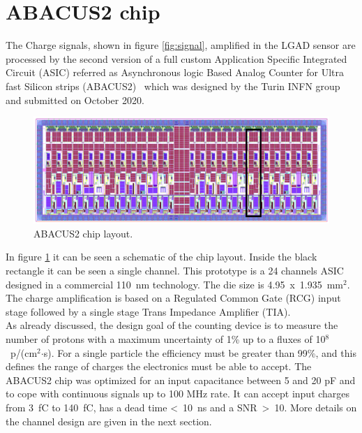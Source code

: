 \section{ABACUS2 chip}\label{chip}
\noindent The Charge signals, shown in figure \ref{fig:signal}, amplified in the LGAD sensor are processed by the second version of a full custom Application Specific Integrated Circuit (ASIC) referred as Asynchronous logic Based Analog Counter for Ultra fast Silicon strips (ABACUS2)~\cite{abacus,dac} which was designed by the Turin INFN group and submitted on October 2020.
\begin{figure}[H]
	\centering
	\includegraphics[width=0.9\linewidth]{IMG/ch2/ABACUS2.png}
	\caption{ABACUS2 chip layout.}
	\label{fig:abacus2}
\end{figure}
\noindent In figure \ref{fig:abacus2} it can be seen a schematic of the chip layout.
Inside the black rectangle it can be seen a single channel.
This prototype is a 24 channels ASIC designed in a commercial 110~nm technology.
The die size is 4.95~x~1.935~mm$^2$.
The charge amplification is based on a Regulated Common Gate (RCG) input stage followed by a single stage Trans Impedance Amplifier (TIA).\\
As already discussed, the design goal of the counting device is to measure the number of protons with a maximum uncertainty of 1\% up to a fluxes of 10$^8$~p/(cm$^2$$\cdot$s).
For a single particle the efficiency must be greater than 99\%, and this defines the range of charges the electronics must be able to accept.
The ABACUS2 chip was optimized for an input capacitance between 5 and 20 pF and to cope with continuous signals up to 100 MHz rate.
It can accept input charges from 3~fC to 140~fC, has a dead time <~10~ns and a SNR~>~10.
More details on the channel design are given in the next section. 


